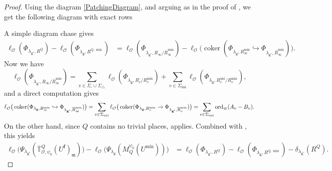 \documentclass[a4paper, notitlepage, 10pt]{amsart}
\theoremstyle{plain} %
\theoremstyle{definition} %
\theoremstyle{remark} %
\numberwithin{equation}{section}
\newcommand{\coker}{\operatorname{coker}} %
\newcommand{\ord}{\operatorname{ord}} %
\newcommand{\uni}{\operatorname{uni}}
\begin{document}
\begin{proof}
Using the diagram \eqref{PatchingDiagram}, and arguing as in the proof of \cite[Theorem 7.14]{BKM1}, we get the following diagram with exact rows
\begin{center}
\end{center}
A simple diagram chase gives
\begin{align*}
     \ell_{\mathcal{O}}(\Phi_{\lambda_{\mathbf{g}'},R^Q})-\ell_{\mathcal{O}}(\Phi_{\lambda_{\mathbf{g}},R^{Q,\min}}) &= \ell_{\mathcal{O}}(\Phi_{\lambda_{\mathbf{g}'},R_{\infty}/\overline{R}_{\infty}^{\min}})-\ell_{\mathcal{O}}\big(\coker( \Phi_{\lambda_{\mathbf{g}},R^{\min}_\infty}\hookrightarrow \Phi_{\lambda_{\mathbf{g}'},\overline{R}^{\min}_\infty})\big).
\end{align*}
Now we have 
$$\ell_{\mathcal{O}}(\Phi_{\lambda_{\mathbf{g}'},R_{\infty}/\overline{R}_{\infty}^{\min}})=\sum_{v\in \Sigma_\square\cup\Sigma_{\triangle}}\ell_{\mathcal{O}}(\Phi_{\lambda_{\mathbf{g}},R^\square_v/R^{\min}_v})+ \sum_{v\in \Sigma_{\uni}} \ell_{\mathcal{O}}(\Phi_{\lambda_{\mathbf{g}},R^{\uni}_v/R^{\min}_v}),$$ and a direct computation gives \begin{equation*}
\scalebox{0.97}{$\displaystyle \ell_{\mathcal{O}}\big(\coker( \Phi_{\lambda_{\mathbf{g}},R^{\min}_\infty}\hookrightarrow \Phi_{\lambda_{\mathbf{g}'},\overline{R}^{\min}_\infty})\big)=\sum_{v\in \Sigma_{\uni}} \ell_{\mathcal{O}}\big( \coker(\Phi_{\lambda_{\mathbf{g}},R^{\min}_v}\to \Phi_{\lambda_{\mathbf{g}'},\overline{R}^{\min}_v})\big)= \sum_{v\in \Sigma_{\uni}} \ord_{\varpi}(A_v-B_v).
$}
\end{equation*}
On the other hand, since $Q$ contains no trivial places,  applies. Combined with , this yields 
\begin{align*}
    \ell_{\mathcal{O}}\big(\Psi_{\lambda_{\mathbf{g}'}}(\overline{\mathbb{T}}{}^{Q}_{\mathcal{O},\psi_0}(U^{\mathbf{f}})_{\mathfrak{m}})\big)-\ell_{\mathcal{O}}\big(\Psi_{\lambda_{\mathbf{g}}}(M^{\psi_0}_Q(U^{\min}))\big) &= \ell_{\mathcal{O}}(\Phi_{\lambda_{\mathbf{g}'},R^Q})-\ell_{\mathcal{O}}(\Phi_{\lambda_{\mathbf{g}},R^{Q,\min}})- \delta_{\lambda_{\mathbf{g}'}}(R^Q).

\end{align*}
\end{proof}
\end{document}
